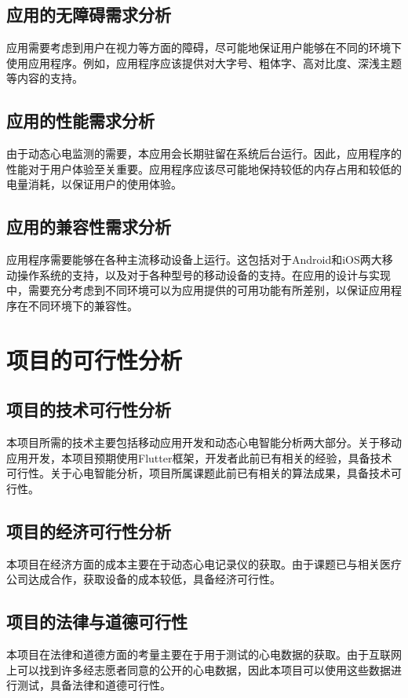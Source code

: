 \subsection{应用的无障碍需求分析}\label{subsec:accessibility}

应用需要考虑到用户在视力等方面的障碍，尽可能地保证用户能够在不同的环境下使用应用程序。例如，应用程序应该提供对大字号、粗体字、高对比度、深浅主题等内容的支持。

\subsection{应用的性能需求分析}\label{subsec:performance}

由于动态心电监测的需要，本应用会长期驻留在系统后台运行。因此，应用程序的性能对于用户体验至关重要。应用程序应该尽可能地保持较低的内存占用和较低的电量消耗，以保证用户的使用体验。

\subsection{应用的兼容性需求分析}\label{subsec:compatibility}

应用程序需要能够在各种主流移动设备上运行。这包括对于Android和iOS两大移动操作系统的支持，以及对于各种型号的移动设备的支持。在应用的设计与实现中，需要充分考虑到不同环境可以为应用提供的可用功能有所差别，以保证应用程序在不同环境下的兼容性。


\section{项目的可行性分析}\label{sec:feasibility}

\subsection{项目的技术可行性分析}\label{subsec:tech-feasibility}

本项目所需的技术主要包括移动应用开发和动态心电智能分析两大部分。关于移动应用开发，本项目预期使用Flutter框架，开发者此前已有相关的经验，具备技术可行性。关于心电智能分析，项目所属课题此前已有相关的算法成果\cite{songDongtaixindiantudezhinengjiancesuanfayanjiuyuyingyong2022}，具备技术可行性。

\subsection{项目的经济可行性分析}\label{subsec:economic-feasibility}

本项目在经济方面的成本主要在于动态心电记录仪的获取。由于课题已与相关医疗公司达成合作，获取设备的成本较低，具备经济可行性。

\subsection{项目的法律与道德可行性}\label{subsec:legal-feasibility}

本项目在法律和道德方面的考量主要在于用于测试的心电数据的获取。由于互联网上可以找到许多经志愿者同意的公开的心电数据，因此本项目可以使用这些数据进行测试，具备法律和道德可行性。
